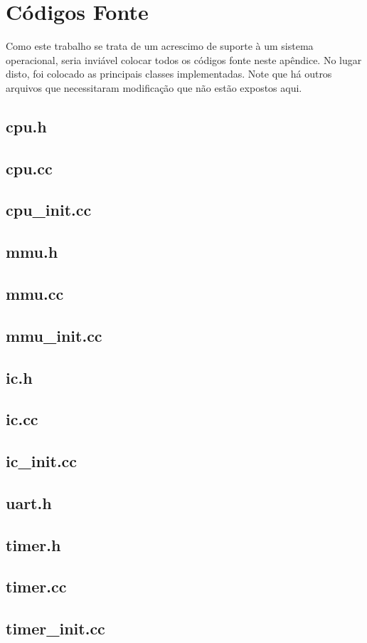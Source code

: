 \chapter{Códigos Fonte}
Como este trabalho se trata de um acrescimo de suporte à um sistema operacional, seria inviável colocar todos os códigos fonte neste apêndice. No lugar disto, foi colocado as principais classes implementadas. Note que há outros arquivos que necessitaram modificação que não estão expostos aqui.

\section{cpu.h}


\section{cpu.cc}


\section{cpu\_init.cc}

\section{mmu.h}


\section{mmu.cc}


\section{mmu\_init.cc}

\section{ic.h}


\section{ic.cc}


\section{ic\_init.cc}

\section{uart.h}

\section{timer.h}


\section{timer.cc}


\section{timer\_init.cc}

